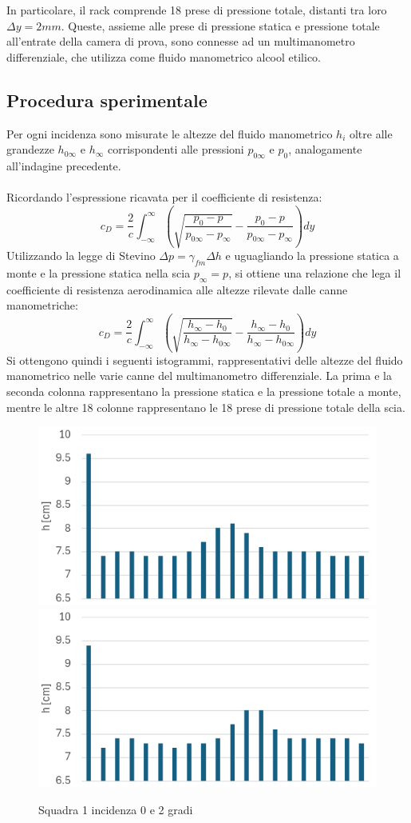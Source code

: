 \noindent In particolare, il rack comprende 18 prese di pressione totale, distanti tra loro $\Delta y= 2mm$. Queste, assieme alle prese di pressione statica e pressione totale all'entrate della camera di prova, sono connesse ad un multimanometro differenziale, che utilizza come fluido manometrico alcool etilico.

\subsection{Procedura sperimentale}\label{istogrammiscia}
Per ogni incidenza sono misurate le altezze del fluido manometrico $h_i$ oltre alle grandezze $h_{0\infty}$ e $h_\infty$ corrispondenti alle pressioni $p_{0\infty}$ e $p_0$, analogamente all'indagine precedente.\\\\
Ricordando l'espressione ricavata per il coefficiente di resistenza:
\begin{equation*}
    c_D = \frac 2c \int_{-\infty}^{\infty} \left( \sqrt{\frac{p_0 - p}{p_{0\infty} - p_\infty}} - \frac{p_0 - p}{p_{0\infty} - p_\infty} \right) dy
\end{equation*}
Utilizzando la legge di Stevino $\Delta p = \gamma_{fm} \Delta h$ e uguagliando la pressione statica a monte e la pressione statica nella scia $p_{\infty}=p$, si ottiene una relazione che lega il coefficiente di resistenza aerodinamica alle altezze rilevate dalle canne manometriche:
\begin{equation*}
    c_D = \frac 2c \int_{-\infty}^\infty \left( \sqrt{\frac{h_\infty - h_0}{h_\infty - h_{0\infty}}} - \frac{h_\infty - h_0}{h_\infty - h_{0\infty}} \right) dy 
\end{equation*}
Si ottengono quindi i seguenti istogrammi, rappresentativi delle altezze del fluido manometrico nelle varie canne del multimanometro differenziale. La prima e la seconda colonna rappresentano la pressione statica e la pressione totale a monte, mentre le altre 18 colonne rappresentano le 18 prese di pressione totale della scia.
\begin{figure}[H]
    \centering
    \includegraphics[width=.49\textwidth]{images/6/s1a0.png}
    \includegraphics[width=.49\textwidth]{images/6/s1a2.png}
    \caption{Squadra 1 incidenza 0 e 2 gradi}
\end{figure}
